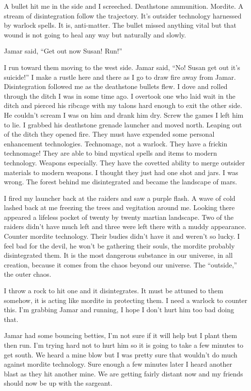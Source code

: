 A bullet hit me in the side and I screeched. Deathstone ammunition. Mordite. A stream of disintegration follow the trajectory. It's outsider technology harnessed by warlock spells. It is, anti-matter. The bullet missed anything vital but that wound is not going to heal any way but naturally and slowly.

Jamar said, ``Get out now Susan! Run!''

I run toward them moving to the west side. Jamar said, ``No! Susan get out it's suicide!'' I make a rustle here and there as I go to draw fire away from Jamar. Disintegration followed me as the deathstone bullets flew. I dove and rolled through the ditch I was in some time ago. I overtook one who laid wait in the ditch and pierced his ribcage with my talons hard enough to exit the other side. He couldn't scream I was on him and drank him dry. Screw the games I left him to lie. I grabbed his deathstone grenade launcher and moved north. Leaping out of the ditch they opened fire. They must have expended some personal enhancement technologies. Technomage, not a warlock. They have a frickin technomage! They are able to bind mystical spells and items to modern technology. Weapons especially. They have the covetted ability to merge outsider materials to modern weapons. I thought they just had one shot and jars. I was wrong. The forest behind me disintegrated and became the landscape of mars.

I fired my launcher back at the raiders and saw a purple flash. A wave of cold lashed back at me freezing the trees and vegitation around me. Looking there appeared a lifeless pocket of twenty by twenty martian landscape. Two of the raiders didn't have much left and three were left there with a muddy appearance. Counter mordite technology. Their budies didn't have it and weren't so lucky. I feel bad for the devil, he won't be gathering their souls, the mordite probably disintegrated them. It is the most dangerous substance in our universe, in all creation, because it comes from the chaos beyond our universe. The ``outside,'' the outer chaos.

I throw a rock to hit one and it disintegrates. It must be attuned to them somehow, it is acting like mordite in protecting them. I need a warlock to counter this. I'm grabbing Jamar and running, I hope I don't hurt him too bad doing that.

Jamar had some bouncing betties, I'm not sure if it will help but I plant them then run. I'm trying hard not to hurt him so it is going to take a few minutes to get south. We heard a mine blow but I was pretty sure that wouldn't do much against mordite technology. Sure enough a few minutes later I heard another blast as they hit another mine. We are getting fairly distant now and my friends should now be up with the sargeant. 

